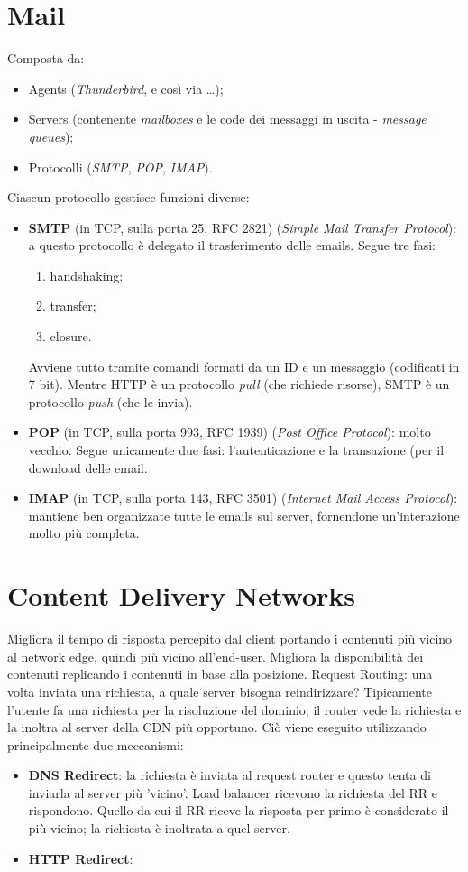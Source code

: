 \newpage

\section{Mail}
Composta da:
\begin{itemize}
    \item Agents (\textit{Thunderbird}, e così via \ldots);
    \item Servers (contenente \textit{mailboxes} e le code dei messaggi in uscita - \textit{message queues});
    \item Protocolli (\textit{SMTP}, \textit{POP}, \textit{IMAP}).
\end{itemize}
Ciascun protocollo gestisce funzioni diverse:
\begin{itemize}
    \item \textbf{SMTP} (in TCP, sulla porta 25, RFC 2821) (\textit{Simple Mail Transfer Protocol}): a questo protocollo è delegato il trasferimento delle emails. Segue tre fasi:
    \begin{enumerate}
        \item handshaking;
        \item transfer;
        \item closure.
    \end{enumerate}
    Avviene tutto tramite comandi formati da un ID e un messaggio (codificati in 7 bit). Mentre HTTP è un protocollo \textit{pull} (che richiede risorse), SMTP è un protocollo \textit{push} (che le invia).
    \item \textbf{POP} (in TCP, sulla porta 993, RFC 1939) (\textit{Post Office Protocol}): molto vecchio. Segue unicamente due fasi: l'autenticazione e la transazione (per il download delle email.
    \item \textbf{IMAP} (in TCP, sulla porta 143, RFC 3501) (\textit{Internet Mail Access Protocol}): mantiene ben organizzate tutte le emails sul server, fornendone  un'interazione molto più completa.
\end{itemize}


\section{Content Delivery Networks}
Migliora il tempo di risposta percepito dal client portando i contenuti più vicino al network edge, quindi più vicino all'end-user.
Migliora la disponibilità dei contenuti replicando i contenuti in base alla posizione.
Request Routing: una volta inviata una richiesta, a quale server bisogna reindirizzare? Tipicamente l'utente fa una richiesta per la risoluzione del dominio; il router vede la richiesta e la inoltra al server della CDN più opportuno. Ciò viene eseguito utilizzando principalmente due meccanismi:
\begin{itemize}
\item \textbf{DNS Redirect}: la richiesta è inviata al request router e questo tenta di inviarla al server più 'vicino'. 
Load balancer ricevono la richiesta del RR e rispondono. Quello da cui il RR riceve la risposta per primo è considerato il più vicino; la richiesta è inoltrata a quel server.
\item \textbf{HTTP Redirect}: %
\end{itemize}
